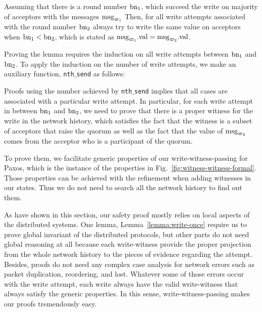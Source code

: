 \begin{lemma}
\label{lemma:write-lift}
Assuming that there is a round number $\mathrm{bn}_1$, which succeed the write on majority of acceptors with the messages
$\mathrm{msg}_{\varpi_1}$ 
Then, for all write attempts associated with the round number $\mathrm{bn}_2$ always try to write  
the same value on acceptors when $\mathrm{bn}_1 < \mathrm{bn}_2$, which is stated as 
$\mathrm{msg}_{\varpi_1}.\mathrm{val} = \mathrm{msg}_{\varpi_2}.\mathrm{val}$.
\end{lemma}

Proving the lemma requires the induction on all write attempts between $\mathrm{bn}_1$ and $\mathrm{bn}_2$. 
To apply the induction on the number of write attempts, we make an auxiliary function, \texttt{nth$\_$send} as follows:



Proofs using the number achieved by  \texttt{nth$\_$send} implies that all cases are associated with a particular write attempt. 
In particular, 
for each write attempt in between $\mathrm{bn}_1$ and $\mathrm{bn}_2$,
we need to prove that 
there is a proper witness for the write in the network history, 
which satisfies the fact that the witness is  a subset of acceptors that raise the quorum
as well as the fact that the value of $\mathrm{msg}_{\varpi_2}$ comes from the acceptor who is a participant of the quorum. 

To prove them, we facilitate generic properties of our write-witness-passing for Paxos,
which is the instance of the properties in Fig.~\ref{fig:witness-witness-formal}.
Those properties can be achieved with the refinement when adding witnesses in our states. Thus we do not need to search all the network history to find out them. 

As have shown in this section, 
our safety proof mostly relies on local aspects of the distributed systems. 
One lemma, Lemma~\ref{lemma:write-once} require us to 
prove global invariant of the distributed protocols, 
but other parts do not need  global reasoning at all because 
each write-witness provide the proper projection from the whole network history to the pieces of evidence regarding 
the attempt. 
Besides, 
proofs do not need any complex case analysis 
for network errors such as packet duplication, reordering, and lost.
Whatever some of those errors occur with the write attempt, 
each write always have the valid write-witness that always satisfy the generic properties. 
In this sense, write-witness-passing makes our proofs tremendously easy.  

